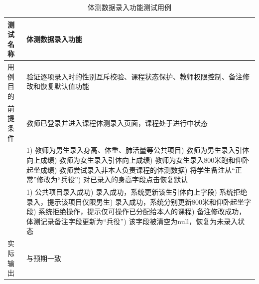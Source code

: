 \begin{table}[H]
  \centering
  \caption{体测数据录入功能测试用例}
  \label{tab:tc-fitness-entry}
  \footnotesize
  \renewcommand{\arraystretch}{1.35}
  \begin{tabularx}{\textwidth}{|L{2.4cm}|X|}
    \hline
    测试名称 & 体测数据录入功能 \\
    \hline
    用例目的 & 验证逐项录入时的性别互斥校验、课程状态保护、教师权限控制、备注修改和恢复默认值功能 \\
    \hline
    前提条件 & 教师已登录并进入课程体测录入页面，课程处于进行中状态 \\
    \hline
     &
      1) 教师为男生录入身高、体重、肺活量等公共项目) 教师为男生录入引体向上成绩) 教师为女生录入引体向上成绩) 教师为女生录入800米跑和仰卧起坐成绩) 教师尝试录入非本人负责课程的体测数据) 将学生备注从“正常”修改为“兵役”) 对已录入的身高字段点击恢复默认 \\
    \hline
     &
      1) 公共项目录入成功) 录入成功，系统更新该生引体向上字段) 系统拒绝录入，提示该项目仅限男生) 录入成功，系统分别更新800米和仰卧起坐字段) 系统拒绝操作，提示仅可操作已分配给本人的课程) 备注修改成功，体测记录备注字段更新为“兵役”) 该字段被清空为null，恢复为未录入状态 \\
    \hline
    实际输出 & 与预期一致 \\
    \hline
  \end{tabularx}
\end{table}

